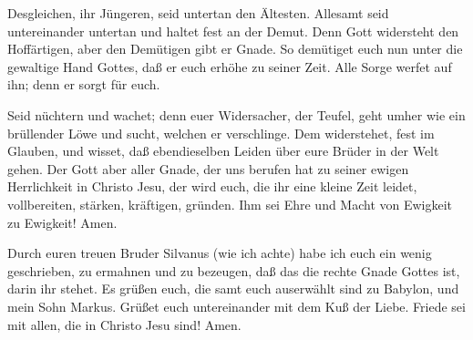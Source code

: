  Desgleichen, ihr Jüngeren, seid untertan den Ältesten.
Allesamt seid untereinander untertan und haltet fest an der Demut. Denn
Gott widersteht den Hoffärtigen, aber den Demütigen gibt er Gnade.
 So demütiget euch nun unter die gewaltige Hand Gottes, daß
er euch erhöhe zu seiner Zeit.  Alle Sorge werfet auf ihn;
denn er sorgt für euch.

 Seid nüchtern und wachet; denn euer Widersacher, der
Teufel, geht umher wie ein brüllender Löwe und sucht, welchen er
verschlinge.  Dem widerstehet, fest im Glauben, und wisset,
daß ebendieselben Leiden über eure Brüder in der Welt gehen.
 Der Gott aber aller Gnade, der uns berufen hat zu seiner
ewigen Herrlichkeit in Christo Jesu, der wird euch, die ihr eine kleine
Zeit leidet, vollbereiten, stärken, kräftigen, gründen. 
Ihm sei Ehre und Macht von Ewigkeit zu Ewigkeit! Amen.

 Durch euren treuen Bruder Silvanus (wie ich achte) habe
ich euch ein wenig geschrieben, zu ermahnen und zu bezeugen, daß das die
rechte Gnade Gottes ist, darin ihr stehet.  Es grüßen euch,
die samt euch auserwählt sind zu Babylon, und mein Sohn Markus.
 Grüßet euch untereinander mit dem Kuß der Liebe. Friede
sei mit allen, die in Christo Jesu sind! Amen.
